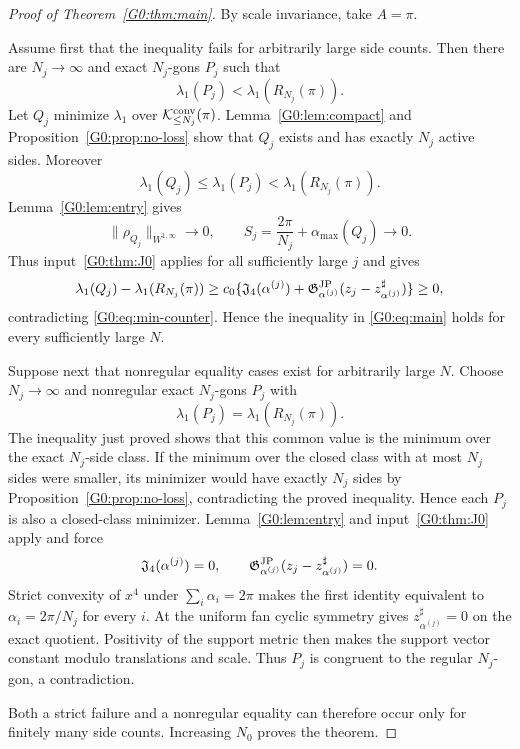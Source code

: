 \begin{proof}[Proof of Theorem~\ref{G0:thm:main}]
By scale invariance, take $A=\pi$.

Assume first that the inequality fails for arbitrarily large side counts.
Then there are $N_j\to\infty$ and exact $N_j$-gons $P_j$ such that
\begin{equation}\label{G0:eq:strict-counter}
 \lambda_1(P_j)<\lambda_1(R_{N_j}(\pi)).
\end{equation}
Let $Q_j$ minimize $\lambda_1$ over
$\mathcal K_{\le N_j}^{\rm conv}(\pi)$.  Lemma~\ref{G0:lem:compact} and
Proposition~\ref{G0:prop:no-loss} show that $Q_j$ exists and has exactly
$N_j$ active sides.  Moreover
\begin{equation}\label{G0:eq:min-counter}
 \lambda_1(Q_j)\le\lambda_1(P_j)
 <\lambda_1(R_{N_j}(\pi)).
\end{equation}
Lemma~\ref{G0:lem:entry} gives
\[
 \|\rho_{Q_j}\|_{W^{1,\infty}}\to0,\qquad
 S_j=\frac{2\pi}{N_j}+\alpha_{\max}(Q_j)\to0.
\]
Thus input~\ref{G0:thm:J0} applies for all sufficiently large $j$ and
gives
\[
 \lambda_1(Q_j)-\lambda_1(R_{N_j}(\pi))
 \ge c_0\{\mathfrak J_4(\alpha^{(j)})
 +\mathfrak G^{\rm JP}_{\alpha^{(j)}}(
 z_j-z_{\alpha^{(j)}}^\sharp)\}\ge0,
\]
contradicting \eqref{G0:eq:min-counter}.  Hence the inequality in
\eqref{G0:eq:main} holds for every sufficiently large $N$.

Suppose next that nonregular equality cases exist for arbitrarily large
$N$.  Choose $N_j\to\infty$ and nonregular exact $N_j$-gons $P_j$ with
\[
 \lambda_1(P_j)=\lambda_1(R_{N_j}(\pi)).
\]
The inequality just proved shows that this common value is the minimum
over the exact $N_j$-side class.  If the minimum over the closed class
with at most $N_j$ sides were smaller, its minimizer would have exactly
$N_j$ sides by Proposition~\ref{G0:prop:no-loss}, contradicting the proved
inequality.  Hence each $P_j$ is also a closed-class minimizer.
Lemma~\ref{G0:lem:entry} and input~\ref{G0:thm:J0} apply and force
\begin{equation}\label{G0:eq:defect-zero}
 \mathfrak J_4(\alpha^{(j)})=0,\qquad
 \mathfrak G^{\rm JP}_{\alpha^{(j)}}(
 z_j-z_{\alpha^{(j)}}^\sharp)=0.
\end{equation}
Strict convexity of $x^4$ under $\sum_i\alpha_i=2\pi$ makes the first
identity equivalent to $\alpha_i=2\pi/N_j$ for every $i$.  At the uniform
fan cyclic symmetry gives
$z_{\alpha^{(j)}}^\sharp=0$ on the exact quotient.  Positivity
of the support metric then makes the support vector constant modulo
translations and scale.  Thus $P_j$ is congruent to the regular
$N_j$-gon, a contradiction.

Both a strict failure and a nonregular equality can therefore occur only
for finitely many side counts.  Increasing $N_0$ proves the theorem.
\end{proof}
\endgroup
